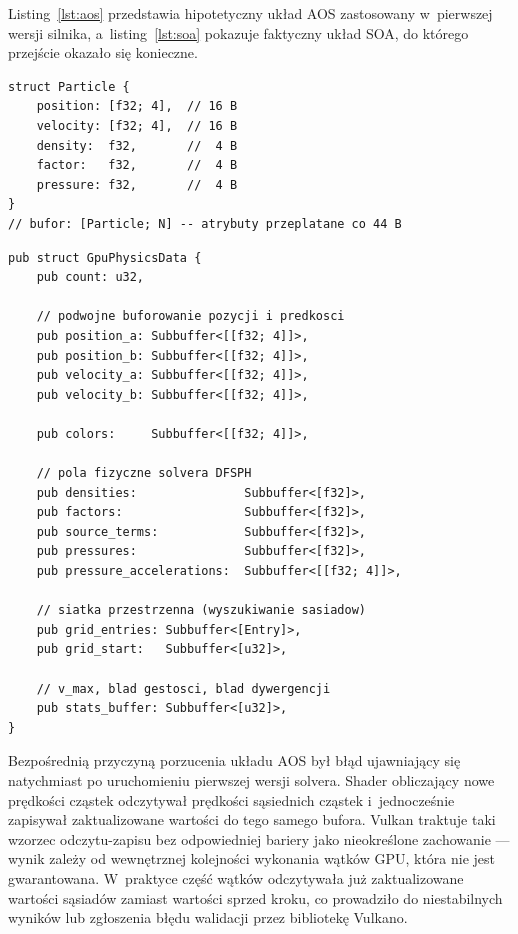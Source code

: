 Listing~\ref{lst:aos} przedstawia hipotetyczny układ AOS zastosowany
w~pierwszej wersji silnika, a~listing~\ref{lst:soa} pokazuje faktyczny
układ SOA, do którego przejście okazało się konieczne.

\begin{lstlisting}[caption={Hipotetyczny układ AOS (porzucony)},
                   label=lst:aos]
struct Particle {
    position: [f32; 4],  // 16 B
    velocity: [f32; 4],  // 16 B
    density:  f32,       //  4 B
    factor:   f32,       //  4 B
    pressure: f32,       //  4 B
}
// bufor: [Particle; N] -- atrybuty przeplatane co 44 B
\end{lstlisting}

\begin{lstlisting}[caption={Kompletna struktura \texttt{GpuPhysicsData} -- układ SOA},
                   label=lst:soa]
pub struct GpuPhysicsData {
    pub count: u32,

    // podwojne buforowanie pozycji i predkosci
    pub position_a: Subbuffer<[[f32; 4]]>,
    pub position_b: Subbuffer<[[f32; 4]]>,
    pub velocity_a: Subbuffer<[[f32; 4]]>,
    pub velocity_b: Subbuffer<[[f32; 4]]>,

    pub colors:     Subbuffer<[[f32; 4]]>,

    // pola fizyczne solvera DFSPH
    pub densities:               Subbuffer<[f32]>,
    pub factors:                 Subbuffer<[f32]>,
    pub source_terms:            Subbuffer<[f32]>,
    pub pressures:               Subbuffer<[f32]>,
    pub pressure_accelerations:  Subbuffer<[[f32; 4]]>,

    // siatka przestrzenna (wyszukiwanie sasiadow)
    pub grid_entries: Subbuffer<[Entry]>,
    pub grid_start:   Subbuffer<[u32]>,

    // v_max, blad gestosci, blad dywergencji
    pub stats_buffer: Subbuffer<[u32]>, 
}
\end{lstlisting}

Bezpośrednią przyczyną porzucenia układu AOS był błąd ujawniający się
natychmiast po uruchomieniu pierwszej wersji solvera.
Shader obliczający nowe prędkości cząstek odczytywał prędkości sąsiednich
cząstek i~jednocześnie zapisywał zaktualizowane wartości do tego samego
bufora.
Vulkan traktuje taki wzorzec odczytu-zapisu bez odpowiedniej bariery
jako nieokreślone zachowanie --- wynik zależy od wewnętrznej kolejności
wykonania wątków GPU, która nie jest gwarantowana.
W~praktyce część wątków odczytywała już zaktualizowane wartości sąsiadów
zamiast wartości sprzed kroku, co prowadziło do niestabilnych wyników
lub zgłoszenia błędu walidacji przez bibliotekę Vulkano.


